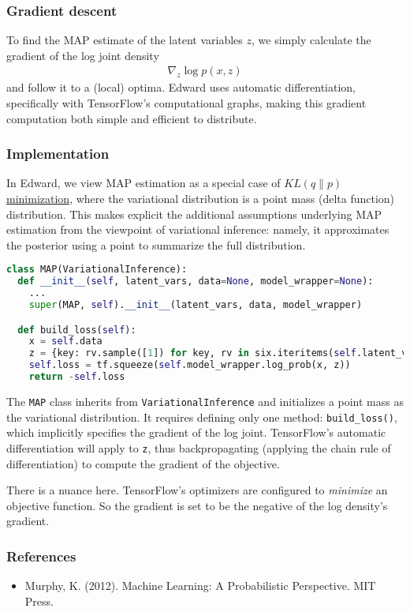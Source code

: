 \subsubsection{Gradient descent}

To find the MAP estimate of the latent variables $z$, we simply
calculate the gradient of the log joint density
\begin{align*}
  \nabla_z
  \log p(x, z)
\end{align*}
and follow it to a (local) optima.
Edward uses automatic differentiation, specifically with TensorFlow's
computational graphs, making this gradient computation both simple and
efficient to distribute.

\subsubsection{Implementation}

In Edward, we view MAP estimation as a special case of
\href{tut_KLqp.html}{$KL(q\|p)$ minimization}, where the variational
distribution is a point mass (delta function) distribution. This makes
explicit the additional assumptions underlying MAP estimation from the
viewpoint of variational inference: namely, it approximates the
posterior using a point to summarize the full distribution.

\begin{lstlisting}[language=Python]
class MAP(VariationalInference):
  def __init__(self, latent_vars, data=None, model_wrapper=None):
    ...
    super(MAP, self).__init__(latent_vars, data, model_wrapper)

  def build_loss(self):
    x = self.data
    z = {key: rv.sample([1]) for key, rv in six.iteritems(self.latent_vars)}
    self.loss = tf.squeeze(self.model_wrapper.log_prob(x, z))
    return -self.loss
\end{lstlisting}

The \texttt{MAP} class inherits from \texttt{VariationalInference} and
initializes a point mass as the variational distribution. It requires
defining only one method:
\texttt{build_loss()}, which implicitly specifies the gradient of the
log joint. TensorFlow's automatic differentiation will apply to
\texttt {z}, thus backpropagating (applying the chain rule of
differentiation) to compute the gradient of the objective.

There is a nuance here. TensorFlow's optimizers are configured to
\emph{minimize} an objective function. So the gradient is set to be
the negative of the log density's gradient.

\subsubsection{References}\label{references}

\begin{itemize}
\item
  Murphy, K. (2012). Machine Learning: A Probabilistic Perspective. MIT Press.
\end{itemize}
